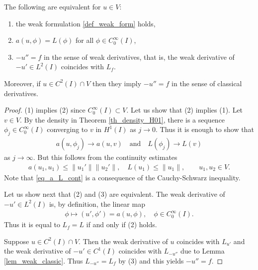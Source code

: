 \documentclass[12pt,oneside]{amsart}
\begin{document}
\begin{lemma}\label{lem_formulations}
The following are equivalent for $u \in V$:
\begin{enumerate}
\item the weak formulation \eqref{def_weak_form} holds,
\item $a(u, \phi) = L(\phi)$ for all $\phi \in C_0^\infty(I)$,
\item $-u'' = f$ in the sense of weak derivatives, that is, the weak derivative of $-u' \in L^2(I)$ coincides with $L_f$.
\end{enumerate}
Moreover, if $u \in C^2(I) \cap V$ then they imply $-u'' = f$ in the sense of classical derivatives. 
\end{lemma}
\begin{proof}
(1) implies (2) since $C_0^\infty(I) \subset V$.
Let us show that (2) implies (1).
Let $v \in V$.
By the density in Theorem \ref{th_density_H01},
there is a sequence $\phi_j \in C_0^\infty(I)$ 
converging to $v$ in $H^1(I)$ as $j \to 0$. 
Thus it is enough to show that 
    \begin{align*}
a(u,\phi_j) \to a(u,v)
\quad \text{and} \quad 
L(\phi_j) \to L(v)
    \end{align*}
as $j \to \infty$. But this follows from the continuity estimates
    \begin{align}\label{eq_a_L_cont}
a(u_1,u_1) \le \|u_1'\| \|u_2'\|,
\quad L(u_1) \le \|u_1\|, \qquad u_1, u_2 \in V.
    \end{align}
Note that \eqref{eq_a_L_cont} is a consequence of the Cauchy-Schwarz inequality.

Let us show next that (2) and (3) are equivalent.
The weak derivative of $-u' \in L^2(I)$ is, by definition, the linear map 
    \begin{align*}
\phi \mapsto (u', \phi') = a(u, \phi), \quad \phi \in C_0^\infty(I).
    \end{align*} 
Thus it is equal to $L_f = L$ if and only if (2) holds.

Suppose $u \in C^2(I) \cap V$.
Then the weak derivative of $u$ coincides with $L_{u'}$
and the weak derivative of $-u' \in C^1(I)$
coincides with $L_{-u''}$ due to Lemma \ref{lem_weak_classic}. Thus $L_{-u''} = L_f$ by (3)
and this yields $-u'' = f$.
\end{proof}
\end{document}
